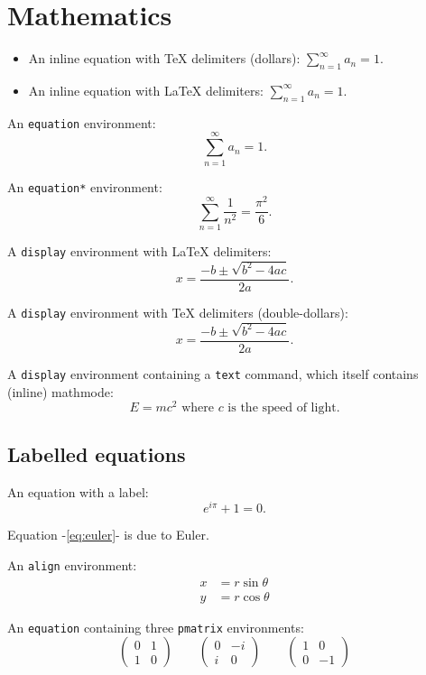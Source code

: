 
\section{Mathematics}

\begin{itemize}
\item
An inline equation with TeX delimiters (dollars): $\sum_{n=1}^{\infty} a_n = 1$.
\item
An inline equation with LaTeX delimiters: \(\sum_{n=1}^{\infty} a_n = 1\).
\end{itemize}

\bigskip
An \texttt{equation} environment:
\begin{equation}
\sum_{n=1}^{\infty} a_n = 1.
\end{equation}

An \texttt{equation*} environment:
\begin{equation*}
\sum_{n=1}^{\infty}\frac{1}{n^2} = \frac{\pi^2}{6}.
\end{equation*}

A \texttt{display} environment with LaTeX delimiters:
\[
x = \frac{-b\pm\sqrt{b^2-4ac}}{2a}.
\]

A \texttt{display} environment with TeX delimiters (double-dollars):
$$
x = \frac{-b\pm\sqrt{b^2-4ac}}{2a}.
$$

A \texttt{display} environment containing a \texttt{text} command, which itself contains (inline) mathmode:
\[
E=mc^2 \text{ where $c$ is the speed of light}.
\]

\subsection{Labelled equations}

An equation with a label:
\begin{equation}\label{eq:euler}
e^{i\pi}+1=0.
\end{equation}

Equation -\eqref{eq:euler}- is due to Euler.

An \texttt{align} environment:
\begin{align}\label{eq:polar}
x & = r\sin\theta \\
y & = r\cos\theta
\end{align}


\bigskip
An {\tt equation} containing three {\tt pmatrix} environments:
\begin{equation}
\begin{pmatrix}0 & 1 \\ 1 & 0\end{pmatrix}
\qquad
\begin{pmatrix}0 & -i \\ i & 0\end{pmatrix}
\qquad
\begin{pmatrix}1 & 0 \\ 0 & -1\end{pmatrix}
\end{equation}

